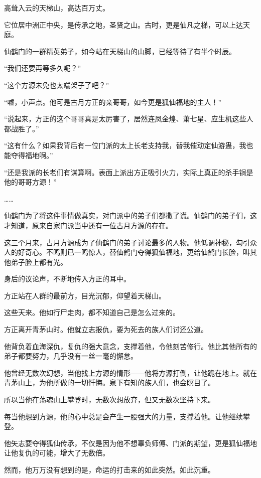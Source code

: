 
\begin{this_body}

高耸入云的天梯山，高达百万丈。

它位居中洲正中央，是传承之地，圣贤之山。古时，更是仙凡之梯，可以上达天庭。

仙鹤门的一群精英弟子，如今站在天梯山的山脚，已经等待了有半个时辰。

“我们还要再等多久呢？”

“这个方源未免也太端架子了吧？”

“嘘，小声点。他可是古月方正的亲哥哥，如今更是狐仙福地的主人！”

“说起来，方正的这个哥哥真是太厉害了，居然连凤金煌、萧七星、应生机这些人都战胜了。”

“这有什么？如果我背后有一位门派的太上长老支持我，替我催动定仙游蛊，我也能夺得福地啊。”

“还是我派的长老们有谋算啊。表面上派出方正吸引火力，实际上真正的杀手锏是他的哥哥方源！”

……

仙鹤门为了将这件事情做真实，对门派中的弟子们都撒了谎。仙鹤门的弟子们，这才知道，原来自家门派当中还有一位古月方源的存在。

这三个月来，古月方源成为了仙鹤门的弟子讨论最多的人物。他低调神秘，勾引众人的好奇心。不鸣则已一鸣惊人，替仙鹤门夺得狐仙福地，更给仙鹤门长脸，叫其他弟子脸上都有光。

身后的议论声，不断地传入方正的耳中。

方正站在人群的最前方，目光沉郁，仰望着天梯山。

这些天来。他如行尸走肉，都不知道自己是怎么过来的。

方正离开青茅山时。他就立志报仇，要为死去的族人们讨还公道。

他背负着血海深仇，复仇的强大意念，支撑着他，令他刻苦修行。他比其他所有的弟子都要努力，几乎没有一丝一毫的懈怠。

他曾经无数次幻想，当他找上方源的情形——他将方源打倒，让他跪在地上。就在青茅山上，为他所做的一切忏悔。泉下有知的族人们，也会瞑目了。

所以当他在荡魂山上攀登时，无数次想放弃，但又无数次坚持下来。

每当他想到方源，他的心中总是会产生一股强大的力量，支撑着他。让他继续攀登。

他矢志要夺得狐仙传承，不仅是因为他不想辜负师傅、门派的期望，更是狐仙福地让他复仇的可能，增大了无数倍。

然而，他万万没有想到的是，命运的打击来的如此突然。如此沉重。


\end{this_body}
